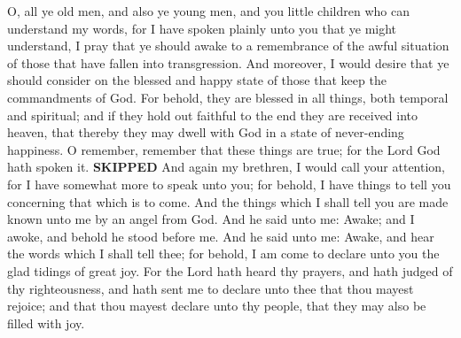 O, all ye old men, and also ye young men, and you little children who can understand my words, for I have spoken plainly unto you that ye might understand, I pray that ye should awake to a remembrance of the awful situation of those that have fallen into transgression.
\bverse \iffalse And moreover, I would desire that ye should consider on the blessed and happy state of those that keep the commandments of God. For behold, they are blessed in all things, both temporal and spiritual; and if they hold out faithful to the end they are received into heaven, that thereby they may dwell with God in a state of never-ending happiness. O remember, remember that these things are true; for the Lord God hath spoken it. \fi
And moreover, I would desire that ye should consider on the blessed and happy state of those that keep the commandments of God. For behold, they are blessed in all things, both temporal and spiritual; and if they hold out faithful to the end they are received into heaven, that thereby they may dwell with God in a state of never-ending happiness. O remember, remember that these things are true; for the Lord God hath spoken it.
\bchapter \textbf{SKIPPED}
\bverse \iffalse And again my brethren, I would call your attention, for I have somewhat more to speak unto you; for behold, I have things to tell you concerning that which is to come. \fi
And again my brethren, I would call your attention, for I have somewhat more to speak unto you; for behold, I have things to tell you concerning that which is to come.
\bverse \iffalse And the things which I shall tell you are made known unto me by an angel from God. And he said unto me: Awake; and I awoke, and behold he stood before me. \fi
And the things which I shall tell you are made known unto me by an angel from God. And he said unto me: Awake; and I awoke, and behold he stood before me.
\bverse \iffalse And he said unto me: Awake, and hear the words which I shall tell thee; for behold, I am come to declare unto you the glad tidings of great joy. \fi
And he said unto me: Awake, and hear the words which I shall tell thee; for behold, I am come to declare unto you the glad tidings of great joy.
\bverse \iffalse For the Lord hath heard thy prayers, and hath judged of thy righteousness, and hath sent me to declare unto thee that thou mayest rejoice; and that thou mayest declare unto thy people, that they may also be filled with joy. \fi
For the Lord hath heard thy prayers, and hath judged of thy righteousness, and hath sent me to declare unto thee that thou mayest rejoice; and that thou mayest declare unto thy people, that they may also be filled with joy.
